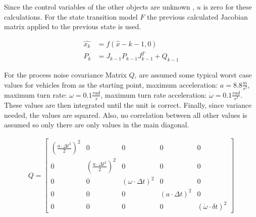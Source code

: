 \documentclass[11pt,oneside,openright]{mpreport}
\begin{document}
Since the control variables of the other objects are unknown , $u$ is zero for these calculations.
For the state transition model $F$ the previous calculated Jacobian matrix applied to the previous state is used.

\begin{align*}
\hat{x_{k}} &= f(\hat{x}-{k-1},0)\\
P_{k}&=J_{k-1} P_{k-1} {J^T_{k-1}} + Q_{k-1}
\end{align*}


For the process noise covariance Matrix $Q$, are assumed some typical worst case values for vehicles from \cite{Kelly1994} as the starting point,
maximum acceleration: $a = 8.8 \frac{m}{s^2}$, maximum turn rate: $\omega = 0.1 \frac{rad}{s}$,   maximum turn rate acceleration: $\dot\omega = 0.1 \frac{rad}{s^2}$.
These values are then integrated until the unit is correct. Finally, since variance needed, the values are squared. 
Also, no correlation between all other values is assumed so only there are only values in the main diagonal.

\begin{align*}
Q=
\begin{bmatrix}
(\frac{a \cdot \Delta t^2}{2})^2 & 0 & 0 & 0 & 0\\
0 & (\frac{a \cdot \Delta t^2}{2})^2 & 0 & 0 & 0\\
0 & 0 & (\omega \cdot \Delta t)^2 & 0 & 0\\
0 & 0 & 0 & (a \cdot \Delta t)^2 & 0\\
0 & 0 & 0 & 0 & (\dot\omega \cdot \delta t)^2
\end{bmatrix} 
\end{align*}

% 
\end{document}
